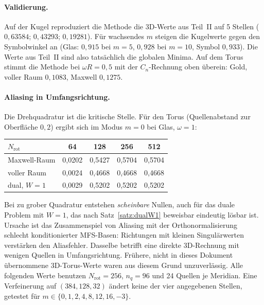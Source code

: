 \documentclass[11pt, a4paper]{article}
\theoremstyle{plain}
\theoremstyle{definition}
\begin{document}
\paragraph{Validierung.} Auf der Kugel reproduziert die Methode die 3D-Werte aus
Teil~II auf 5 Stellen ($0{,}63584$; $0{,}43293$; $0{,}19281$). Für wachsendes $m$
steigen die Kugelwerte gegen den Symbolwinkel an (Glas: $0{,}915$ bei
$m=5$, $0{,}928$ bei $m=10$, Symbol $0{,}933$). Die Werte aus Teil~II sind also
tatsächlich die globalen Minima. Auf dem Torus stimmt die Methode bei $\omega R=0{,}5$
mit der $C_n$-Rechnung oben überein: Gold, voller Raum $0{,}1083$, Maxwell $0{,}1275$.

\paragraph{Aliasing in Umfangsrichtung.} Die Drehquadratur ist die kritische
Stelle. Für den Torus (Quellenabstand zur Oberfläche $0{,}2$) ergibt sich im Modus
$m=0$ bei Glas, $\omega=1$:
\begin{center}\small
\begin{tabular}{lcccc}
\toprule
$N_{\mathrm{rot}}$ & 64 & 128 & 256 & 512\\
\midrule
Maxwell-Raum & 0,0202 & 0,5427 & 0,5704 & 0,5704\\
voller Raum & 0,0024 & 0,4668 & 0,4668 & 0,4668\\
dual, $W=1$ & 0,0029 & 0,5202 & 0,5202 & 0,5202\\
\bottomrule
\end{tabular}
\end{center}
Bei zu grober Quadratur entstehen \emph{scheinbare} Nullen, auch für das duale
Problem mit $W=1$, das nach Satz~\ref{satz:dualW1} beweisbar eindeutig lösbar ist.
Ursache ist das Zusammenspiel von Aliasing mit der Orthonormalisierung schlecht
konditionierter MFS-Basen: Richtungen mit kleinen Singulärwerten verstärken den
Aliasfehler. Dasselbe betrifft eine direkte 3D-Rechnung mit wenigen Quellen in
Umfangsrichtung. Frühere, nicht in dieses Dokument übernommene 3D-Torus-Werte
waren aus diesem Grund unzuverlässig. Alle folgenden Werte benutzen
$N_{\mathrm{rot}}=256$, $n_q=96$ und 24 Quellen je Meridian. Eine Verfeinerung auf
$(384,128,32)$ ändert keine der vier angegebenen Stellen, getestet für
$m\in\{0,1,2,4,8,12,16,-3\}$.
\end{document}

